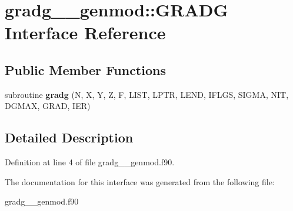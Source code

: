 \hypertarget{interfacegradg____genmod_1_1_g_r_a_d_g}{\section{gradg\+\_\+\+\_\+genmod\+:\+:G\+R\+A\+D\+G Interface Reference}
\label{interfacegradg____genmod_1_1_g_r_a_d_g}
}
\subsection*{Public Member Functions}
\begin{DoxyCompactItemize}
\item 
\hypertarget{interfacegradg____genmod_1_1_g_r_a_d_g_a6e5f141c560be9856a786d7e877cdf06}{subroutine {\bfseries gradg} (N, X, Y, Z, F, L\+I\+S\+T, L\+P\+T\+R, L\+E\+N\+D, I\+F\+L\+G\+S, S\+I\+G\+M\+A, N\+I\+T, D\+G\+M\+A\+X, G\+R\+A\+D, I\+E\+R)}\label{interfacegradg____genmod_1_1_g_r_a_d_g_a6e5f141c560be9856a786d7e877cdf06}

\end{DoxyCompactItemize}


\subsection{Detailed Description}


Definition at line 4 of file gradg\+\_\+\+\_\+genmod.\+f90.



The documentation for this interface was generated from the following file\+:\begin{DoxyCompactItemize}
\item 
gradg\+\_\+\+\_\+genmod.\+f90\end{DoxyCompactItemize}
